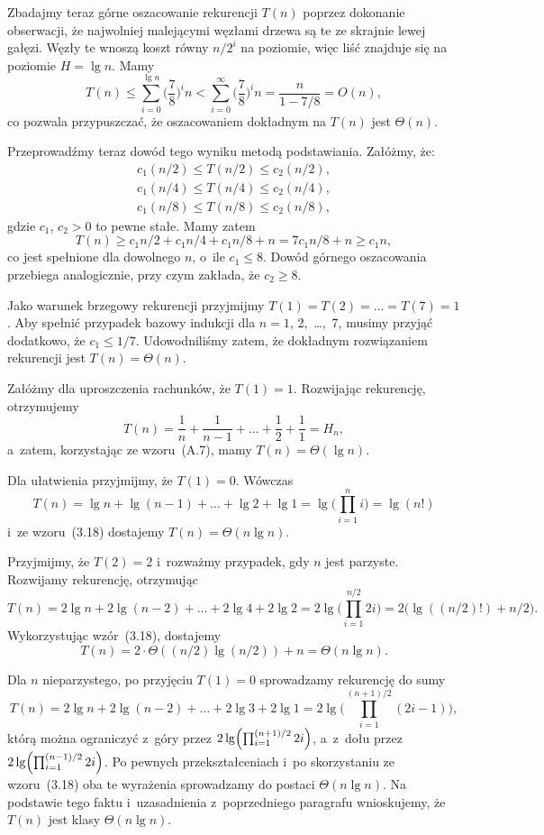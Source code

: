 Zbadajmy teraz górne oszacowanie rekurencji $T(n)$ poprzez dokonanie obserwacji, że najwolniej malejącymi węzłami drzewa są te ze skrajnie lewej gałęzi. Węzły te wnoszą koszt równy $n/2^i$ na  poziomie, więc liść znajduje się na poziomie $H=\lg n$. Mamy
\[
	T(n) \le \sum_{i=0}^{\lg n}\biggl(\frac{7}{8}\biggr)^in < \sum_{i=0}^\infty\biggl(\frac{7}{8}\biggr)^in = \frac{n}{1-7/8} = O(n),
\]
co pozwala przypuszczać, że oszacowaniem dokładnym na $T(n)$ jest $\Theta(n)$.

Przeprowadźmy teraz dowód tego wyniku metodą podstawiania. Załóżmy, że:
\begin{gather*}
	c_1(n/2) \le T(n/2) \le c_2(n/2), \\
	c_1(n/4) \le T(n/4) \le c_2(n/4), \\
	c_1(n/8) \le T(n/8) \le c_2(n/8),
\end{gather*}
gdzie $c_1$, $c_2>0$ to pewne stałe. Mamy zatem
\[
	T(n) \ge c_1n/2+c_1n/4+c_1n/8+n = 7c_1n/8+n \ge c_1n,
\]
co jest spełnione dla dowolnego $n$, o~ile $c_1\le8$. Dowód górnego oszacowania przebiega analogicznie, przy czym zakłada, że $c_2\ge8$.

Jako warunek brzegowy rekurencji przyjmijmy $T(1)=T(2)=\dots=T(7)=1$. Aby spełnić przypadek bazowy indukcji dla $n=1$, 2,~\dots,~7, musimy przyjąć dodatkowo, że $c_1\le1/7$. Udowodniliśmy zatem, że dokładnym rozwiązaniem rekurencji jest $T(n)=\Theta(n)$.

\subproblem %
Załóżmy dla uproszczenia rachunków, że $T(1)=1$. Rozwijając rekurencję, otrzymujemy
\[
	T(n) = \frac{1}{n}+\frac{1}{n-1}+\dots+\frac{1}{2}+\frac{1}{1} = H_n,
\]
a~zatem, korzystając ze wzoru~(A.7), mamy $T(n)=\Theta(\lg n)$.

\subproblem %
Dla ułatwienia przyjmijmy, że $T(1)=0$. Wówczas
\[
	T(n) = \lg n+\lg(n-1)+\dots+\lg2+\lg1 = \lg\biggl(\prod_{i=1}^ni\biggr) = \lg(n!)
\]
i~ze wzoru~(3.18) dostajemy $T(n)=\Theta(n\lg n)$.

\subproblem %
Przyjmijmy, że $T(2)=2$ i~rozważmy przypadek, gdy $n$ jest parzyste. Rozwijamy rekurencję, otrzymując
\[
	T(n) = 2\lg n+2\lg(n-2)+\dots+2\lg4+2\lg2 = 2\lg\biggl(\prod_{i=1}^{n/2}2i\biggr) = 2\bigl(\lg((n/2)!)+n/2\bigr).
\]
Wykorzystując wzór~(3.18), dostajemy
\[
	T(n) = 2\cdot\Theta((n/2)\lg (n/2))+n = \Theta(n\lg n).
\]

Dla $n$ nieparzystego, po przyjęciu $T(1)=0$ sprowadzamy rekurencję do sumy
\[
	T(n) = 2\lg n+2\lg(n-2)+\dots+2\lg3+2\lg1 = 2\lg\biggl(\prod_{i=1}^{(n+1)/2}(2i-1)\biggr),
\]
którą można ograniczyć z~góry przez $2\lg\Bigl(\prod_{i=1}^{(n+1)/2}2i\Bigr)$, a~z~dołu przez $2\lg\Bigl(\prod_{i=1}^{(n-1)/2}2i\Bigr)$. Po pewnych przekształceniach i~po skorzystaniu ze wzoru~(3.18) oba te wyrażenia sprowadzamy do postaci $\Theta(n\lg n)$. Na podstawie tego faktu i~uzasadnienia z~poprzedniego paragrafu wnioskujemy, że $T(n)$ jest klasy $\Theta(n\lg n)$.

